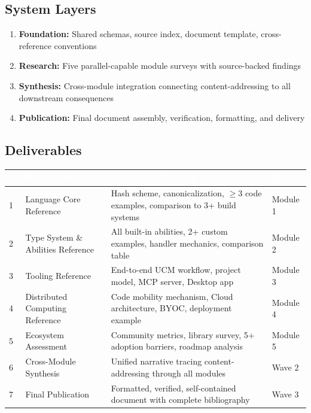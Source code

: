 \documentclass[11pt,letterpaper]{article}
\newcommand{\tableheader}[1]{\textbf{\sffamily\textcolor{white}{#1}}}
\begin{document}
\subsection{System Layers}

\begin{enumerate}[label=\textbf{\arabic*.}]
  \item \textbf{Foundation:} Shared schemas, source index, document template, cross-reference conventions
  \item \textbf{Research:} Five parallel-capable module surveys with source-backed findings
  \item \textbf{Synthesis:} Cross-module integration connecting content-addressing to all downstream consequences
  \item \textbf{Publication:} Final document assembly, verification, formatting, and delivery
\end{enumerate}

\subsection{Deliverables}

\begin{center}
\begin{tabularx}{\textwidth}{C{0.5cm}L{3cm}XL{3cm}}
\toprule
{}
\tableheader{\#} & \tableheader{Deliverable} & \tableheader{Acceptance Criteria} & \tableheader{Spec} \\
 & Language Core Reference & Hash scheme, canonicalization, $\geq$3 code examples, comparison to 3+ build systems & Module 1 \\
2 & Type System \& Abilities Reference & All built-in abilities, 2+ custom examples, handler mechanics, comparison table & Module 2 \\
3 & Tooling Reference & End-to-end UCM workflow, project model, MCP server, Desktop app & Module 3 \\
4 & Distributed Computing Reference & Code mobility mechanism, Cloud architecture, BYOC, deployment example & Module 4 \\
5 & Ecosystem Assessment & Community metrics, library survey, 5+ adoption barriers, roadmap analysis & Module 5 \\
6 & Cross-Module Synthesis & Unified narrative tracing content-addressing through all modules & Wave 2 \\
7 & Final Publication & Formatted, verified, self-contained document with complete bibliography & Wave 3 \\
\bottomrule
\end{tabularx}
\end{center}
\end{document}
